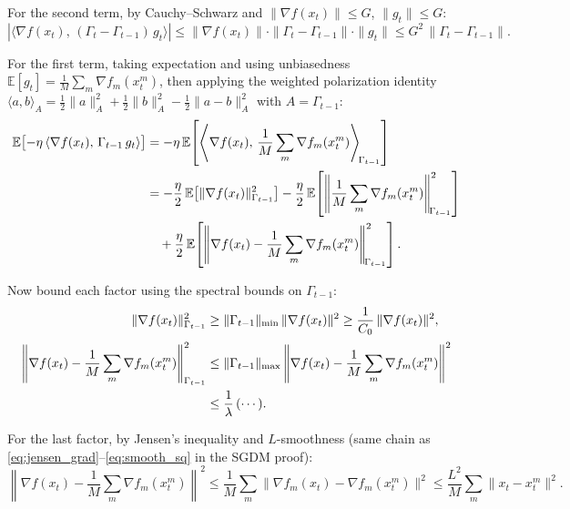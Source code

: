 \documentclass{article}
\begin{document}
For the second term, by Cauchy--Schwarz and
$\|\nabla f(x_t)\| \leq G$, $\|g_t\| \leq G$:
\begin{equation}
|\langle \nabla f(x_t),\, (\Gamma_t - \Gamma_{t-1})\,g_t \rangle|
\leq \|\nabla f(x_t)\| \cdot \|\Gamma_t - \Gamma_{t-1}\| \cdot \|g_t\|
\leq G^2\,\|\Gamma_t - \Gamma_{t-1}\|.
\label{eq:adam_I_perturb}
\end{equation}

For the first term, taking expectation and using unbiasedness
$\mathbb{E}[g_t] = \frac{1}{M}\sum_m \nabla f_m(x_t^m)$, then applying the
weighted polarization identity
$\langle a,b \rangle_A = \frac{1}{2}\|a\|_A^2 + \frac{1}{2}\|b\|_A^2
- \frac{1}{2}\|a-b\|_A^2$ with $A = \Gamma_{t-1}$:
\begin{align}
\mathbb{E}\bigl[-\eta\,\langle \nabla f(x_t),\,
\Gamma_{t-1}\,g_t \rangle\bigr]
&= -\eta\,\mathbb{E}\!\left[\left\langle \nabla f(x_t),\,
   \frac{1}{M}\sum_m \nabla f_m(x_t^m)
   \right\rangle_{\!\Gamma_{t-1}}\right] \notag \\
&= -\frac{\eta}{2}\,\mathbb{E}\bigl[\|\nabla f(x_t)\|_{\Gamma_{t-1}}^2\bigr]
   - \frac{\eta}{2}\,\mathbb{E}\!\left[\left\|
   \frac{1}{M}\sum_m \nabla f_m(x_t^m)
   \right\|_{\!\Gamma_{t-1}}^2\right] \notag \\
&\quad+ \frac{\eta}{2}\,\mathbb{E}\!\left[\left\|
   \nabla f(x_t) - \frac{1}{M}\sum_m \nabla f_m(x_t^m)
   \right\|_{\!\Gamma_{t-1}}^2\right].
\label{eq:adam_I_polar}
\end{align}

Now bound each factor using the spectral bounds on $\Gamma_{t-1}$:
\begin{align}
\|\nabla f(x_t)\|_{\Gamma_{t-1}}^2
&\geq \|\Gamma_{t-1}\|_{\min}\,\|\nabla f(x_t)\|^2
 \geq \frac{1}{C_0}\,\|\nabla f(x_t)\|^2,
\label{eq:adam_I_lower} \\[2pt]
\left\|\nabla f(x_t) - \frac{1}{M}\sum_m \nabla f_m(x_t^m)
\right\|_{\Gamma_{t-1}}^2
&\leq \|\Gamma_{t-1}\|_{\max}
\left\|\nabla f(x_t)-\frac{1}{M}\sum_m \nabla f_m(x_t^m)\right\|^2 \notag\\
&\leq \frac{1}{\lambda}\,(\cdots).
\label{eq:adam_I_upper}
\end{align}

For the last factor, by Jensen's inequality and $L$-smoothness (same chain as
\eqref{eq:jensen_grad}--\eqref{eq:smooth_sq} in the SGDM proof):
\begin{equation}
\left\|\nabla f(x_t) - \frac{1}{M}\sum_m\nabla f_m(x_t^m)\right\|^2
\leq \frac{1}{M}\sum_m \|\nabla f_m(x_t) - \nabla f_m(x_t^m)\|^2
\leq \frac{L^2}{M}\sum_m \|x_t - x_t^m\|^2.
\label{eq:adam_I_jensen}
\end{equation}
\end{document}
